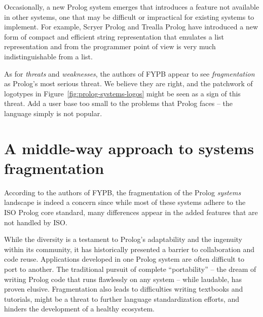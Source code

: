 Occasionally, a new Prolog system emerges that introduces a feature not available in other systems, one that may be difficult or impractical for existing systems to implement. For example, Scryer Prolog and Trealla Prolog have introduced a new form of compact and efficient string representation that emulates a list representation and from the programmer point of view is very much indistinguishable from a list.

As for \textit{threats} and \textit{weaknesses}, the authors of FYPB appear to see \textit{fragmentation} as Prolog's most serious threat. We believe they are right, and the patchwork of logotypes in Figure~\ref{fig:prolog-systems-logos} might be seen as a sign of this threat. Add a user base too small to the problems that Prolog faces -- the language simply is not popular.



%


\section{A middle-way approach to systems fragmentation}

According to the authors of FYPB, the fragmentation of the Prolog \textit{systems} landscape is indeed a concern since while most of these systems adhere to the ISO Prolog core standard, many differences appear in the added features that are not handled by ISO. 

While the diversity is a testament to Prolog's adaptability and the ingenuity within its community, it has historically presented a barrier to collaboration and code reuse. Applications developed in one Prolog system are often difficult to port to another. The traditional pursuit of complete ``portability'' -- the dream of writing Prolog code that runs flawlessly on any system -- while laudable, has proven elusive.
Fragmentation also leads to difficulties writing textbooks and tutorials, might be a threat to further language standardization efforts, and hinders the development of a healthy ecosystem. 

